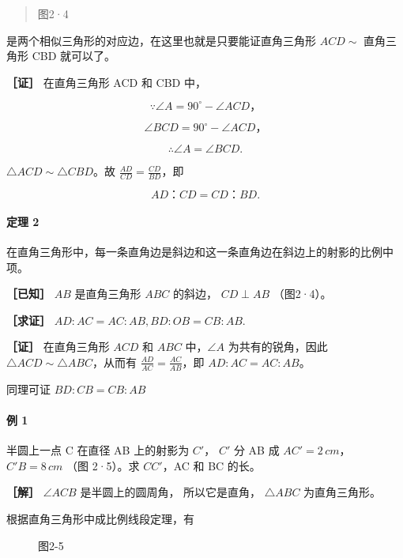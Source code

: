 \begin{quote}
图2·4
\end{quote}

是两个相似三角形的对应边，在这里也就是只要能证直角三角形 \(ACD \sim\)
直角三角形 CBD 就可以了。

\textbf{［证］} 在直角三角形 ACD 和 CBD 中，

\[
\because \angle A = 90 ^ {\circ} - \angle A C D\text{，}
\]

\[
\angle B C D = 90 ^ {\circ} - \angle A C D\text{，}
\]

\[
\therefore \angle A = \angle B C D.
\]

\(\triangle ACD \sim \triangle CBD\)。故
\(\frac{AD}{CD} = \frac{CD}{BD}\)，即

\[
A D\text{：} C D = C D\text{：} B D.
\]

\paragraph{定理 2}

在直角三角形中，每一条直角边是斜边和这一条直角边在斜边上的射影的比例中项。

\textbf{［已知］} \(AB\) 是直角三角形 \(ABC\) 的斜边， \(CD \perp AB\)
（图2·4）。

\textbf{［求证］} \(AD:AC = AC:AB,BD:OB = CB:AB.\)

\textbf{［证］} 在直角三角形 \(ACD\) 和 \(ABC\) 中，\(\angle A\)
为共有的锐角，因此 \(\triangle ACD \sim \triangle ABC\)，从而有
\(\frac{AD}{AC} = \frac{AC}{AB}\)，即 \(AD:AC = AC:AB\)。

同理可证 \(BD:CB = CB:AB\)

\paragraph{例 1}

半圆上一点 C 在直径 AB 上的射影为 \(C'\)， \(C'\) 分 AB 成
\(AC' = 2 \, cm\)， \(C'B = 8 \, cm\) （图 2·5）。求 \(CC'\)，AC 和 BC
的长。

\textbf{［解］} \(\angle ACB\) 是半圆上的圆周角， 所以它是直角，
\(\triangle ABC\) 为直角三角形。

根据直角三角形中成比例线段定理，有

\begin{figure}
\centering
{}
\caption{图2-5}
\end{figure}

